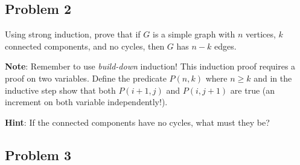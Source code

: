 \documentclass[12pt,letterpaper]{article}
\newcommand\hint[1]{\textbf{Hint}: #1}
\newcommand\note[1]{\textbf{Note}: #1}
\newcounter{enum22i}
\begin{document}
\subsection*{Problem 2}
{
{\setcounter{enum22i}{0}
Using strong induction, prove that if $G$ is a simple graph with $n$ vertices, $k$ connected components, and no cycles, then $G$ has $n-k$ edges.

\note{Remember to use \textit{build-down} induction! This induction proof requires a proof on two variables. Define the predicate $P(n,k)$ where $n\geq k$ and in the inductive step show that both $P(i+1,j)$ and $P(i,j+1)$ are true (an increment on both variable independently!).}

\hint{If the connected components have no cycles, what must they be?}
}
}


\subsection*{Problem 3}
\end{document}
